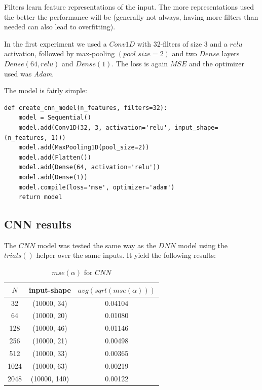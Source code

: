 \documentclass[a4paper, 12pt]{report}
\begin{document}
Filters learn feature representations of the input. The more representations used the better the performance will be (generally not always, having more filters than needed can also lead to overfitting).

In the first experiment we used a $Conv1D$ with 32-filters of size 3 and a $relu$ activation, followed by max-pooling $(pool\_size=2)$ and two $Dense$ layers $Dense(64, relu)$ and $Dense(1)$. The loss is again $MSE$ and the optimizer used was \textit{Adam}.

The model is fairly simple:
\begin{verbatim}
def create_cnn_model(n_features, filters=32):
    model = Sequential()
    model.add(Conv1D(32, 3, activation='relu', input_shape=(n_features, 1)))
    model.add(MaxPooling1D(pool_size=2))
    model.add(Flatten())
    model.add(Dense(64, activation='relu'))
    model.add(Dense(1))
    model.compile(loss='mse', optimizer='adam')
    return model
\end{verbatim}

\subsection{CNN results}
The $CNN$ model was tested the same way as the $DNN$ model using the $trials()$ helper over the same inputs. It yield the following results:

\begin{table}[h!]
    \centering
    \begin{tabular}{||c c c||} 
        \hline
        $N$ & input-shape & $avg(sqrt(mse(\alpha)))$ \\ [0.5ex] 
        \hline\hline
        32 & (10000, 34) & 0.04104 \\ 
        \hline
        64 & (10000, 20) & 0.01080 \\
        \hline
        128 & (10000, 46) & 0.01146 \\
        \hline
        256 & (10000, 21) & 0.00498 \\
        \hline
        512 & (10000, 33) & 0.00365 \\ 
        \hline
        1024 & (10000, 63) & 0.00219 \\ 
        \hline
        2048 & (10000, 140) & 0.00122 \\ 
        \hline
    \end{tabular}
    \caption{$mse(\alpha)$ for $CNN$}
    \label{table:3}
\end{table}
\end{document}
